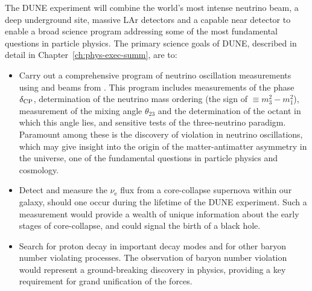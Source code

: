 The DUNE experiment will combine the world's most intense neutrino beam, a deep underground site, massive LAr detectors and a capable near detector to enable a broad science program addressing some of the most fundamental questions in particle physics. 
The primary science goals of DUNE, described in detail in Chapter~\ref{ch:phys-exec-summ}, are to: 
\begin{itemize}

\item Carry out a comprehensive program of neutrino oscillation measurements using \numu and \anumu beams from \fnal. This program includes measurements of the   phase $\delta_{\rm CP}$, determination of the neutrino mass ordering (the sign of $ \equiv m_3^2-m_1^2$), measurement of the mixing angle $\theta_{23}$ and the determination of the octant in which this angle lies,
and sensitive tests of the three-neutrino paradigm. Paramount among these is the discovery of  violation in neutrino oscillations, which may give insight into the origin of the matter-antimatter asymmetry in the universe, one of the fundamental questions in particle physics and cosmology. 

\item Detect and measure the $\nu_\text{e}$ flux from a core-collapse supernova within our galaxy, should one occur during the lifetime of the DUNE experiment. Such a measurement would provide a wealth of unique information about the early stages of core-collapse, and could signal the birth of a black hole.
    
\item Search for proton decay in important decay modes and for other baryon number violating processes. The observation of baryon number violation would represent a ground-breaking discovery in physics, providing a key requirement for grand unification of the forces. 

\end{itemize}


